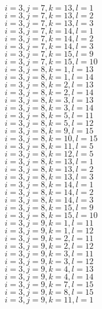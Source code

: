 \documentclass[14pt]{article}
\begin{document}
    $i=3,j=7,k=13,l=1 $ \\ 
    $i=3,j=7,k=13,l=2 $ \\ 
    $i=3,j=7,k=13,l=3 $ \\ 
    $i=3,j=7,k=14,l=1 $ \\ 
    $i=3,j=7,k=14,l=2 $ \\ 
    $i=3,j=7,k=14,l=3 $ \\ 
    $i=3,j=7,k=15,l=9 $ \\ 
    $i=3,j=7,k=15,l=10 $ \\ 
    $i=3,j=8,k=1,l=13 $ \\ 
    $i=3,j=8,k=1,l=14 $ \\ 
    $i=3,j=8,k=2,l=13 $ \\ 
    $i=3,j=8,k=2,l=14 $ \\ 
    $i=3,j=8,k=3,l=13 $ \\ 
    $i=3,j=8,k=3,l=14 $ \\ 
    $i=3,j=8,k=5,l=11 $ \\ 
    $i=3,j=8,k=5,l=12 $ \\ 
    $i=3,j=8,k=9,l=15 $ \\ 
    $i=3,j=8,k=10,l=15 $ \\ 
    $i=3,j=8,k=11,l=5 $ \\ 
    $i=3,j=8,k=12,l=5 $ \\ 
    $i=3,j=8,k=13,l=1 $ \\ 
    $i=3,j=8,k=13,l=2 $ \\ 
    $i=3,j=8,k=13,l=3 $ \\ 
    $i=3,j=8,k=14,l=1 $ \\ 
    $i=3,j=8,k=14,l=2 $ \\ 
    $i=3,j=8,k=14,l=3 $ \\ 
    $i=3,j=8,k=15,l=9 $ \\ 
    $i=3,j=8,k=15,l=10 $ \\ 
    $i=3,j=9,k=1,l=11 $ \\ 
    $i=3,j=9,k=1,l=12 $ \\ 
    $i=3,j=9,k=2,l=11 $ \\ 
    $i=3,j=9,k=2,l=12 $ \\ 
    $i=3,j=9,k=3,l=11 $ \\ 
    $i=3,j=9,k=3,l=12 $ \\ 
    $i=3,j=9,k=4,l=13 $ \\ 
    $i=3,j=9,k=4,l=14 $ \\ 
    $i=3,j=9,k=7,l=15 $ \\ 
    $i=3,j=9,k=8,l=15 $ \\ 
    $i=3,j=9,k=11,l=1 $ \\ 
\end{document}
